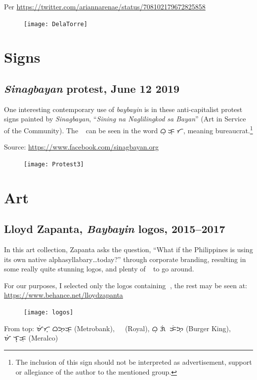 \documentclass[a4paper,pagesize,openany,14pt,parskip=never]{scrbook}
\newcommand{\≈}{$\approx$}
\newcommand{\ra}{{\baybayin ᜍ}}
\begin{document}
Per \url{https://twitter.com/ariannarenae/status/708102179672825858}

\begin{figure}[H]
\texttt{[image: DelaTorre]}
\end{figure}

\section{Signs}

\subsection{{\em Sinagbayan} protest, June 12 2019}

One interesting contemporary use of {\em baybayin} is in these anti-capitalist protest signs painted by {\em Sinagbayan}, ``{\em Sining na Naglilingkod sa Bayan}'' (Art in Service of the Community). The \ra\ can be seen in the word {\baybayin ᜊᜓᜍᜓᜃ᜔ᜍᜆ}, meaning bureaucrat.\footnote{The inclusion of this sign should not be interpreted as advertisement, support or allegiance of the author to the mentioned group.}

Source: \url{https://www.facebook.com/sinagbayan.org}

\begin{figure}[H]
\texttt{[image: Protest3]}
\end{figure}

\section{Art}

\subsection{Lloyd Zapanta, {\em Baybayin} logos, 2015--2017}

In this art collection, Zapanta asks the question, ``What if the Philippines is using its own native alphasyllabary\ldots today?'' through corporate branding, resulting in some really quite stunning logos, and plenty of \ra\ to go around.

For our purposes, I selected only the logos containing \ra, the rest may be seen at: \url{https://www.behance.net/lloydzapanta}

\begin{figure}[H]
\texttt{[image: logos]}
\end{figure}

From top: {\baybayin ᜋᜒᜆ᜔ᜍᜓᜊᜅ᜔ᜃ᜔} (Metrobank), {\baybayin ᜍᜓᜌᜎ᜔} (Royal), {\baybayin ᜊᜓᜍ᜔ᜄᜒᜍ᜔ ᜃᜒᜅ᜔} (Burger King), {\baybayin ᜋᜒᜍᜎ᜔ᜃᜓ} (Meralco)
\end{document}
